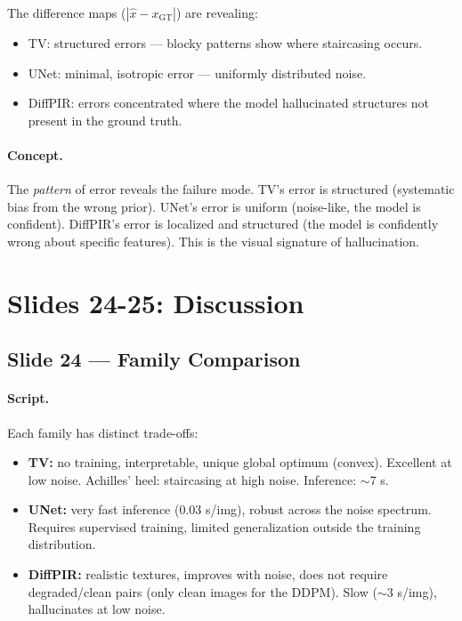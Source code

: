 \documentclass[english,11pt,a4paper]{article}
\begin{document}
The difference maps ($|\hat{x} - x_{\text{GT}}|$) are revealing:
\begin{itemize}
\item TV: structured errors --- blocky patterns show where staircasing
occurs.
\item UNet: minimal, isotropic error --- uniformly distributed noise.
\item DiffPIR: errors concentrated where the model hallucinated
structures not present in the ground truth.
\end{itemize}

\paragraph{Concept.}
The \textit{pattern} of error reveals the failure mode. TV's error
is structured (systematic bias from the wrong prior). UNet's error is
uniform (noise-like, the model is confident). DiffPIR's error is
localized and structured (the model is confidently wrong about
specific features). This is the visual signature of hallucination.

\section{Slides 24-25: Discussion}

\subsection{Slide 24 --- Family Comparison}

\paragraph{Script.}
Each family has distinct trade-offs:

\begin{itemize}
\item \textbf{TV:} no training, interpretable, unique global optimum
(convex). Excellent at low noise. Achilles' heel: staircasing at high
noise. Inference: $\sim$7 s.
\item \textbf{UNet:} very fast inference (0.03 s/img), robust across
the noise spectrum. Requires supervised training, limited generalization
outside the training distribution.
\item \textbf{DiffPIR:} realistic textures, improves with noise, does
not require degraded/clean pairs (only clean images for the DDPM).
Slow ($\sim$3 s/img), hallucinates at low noise.
\end{itemize}
\end{document}
